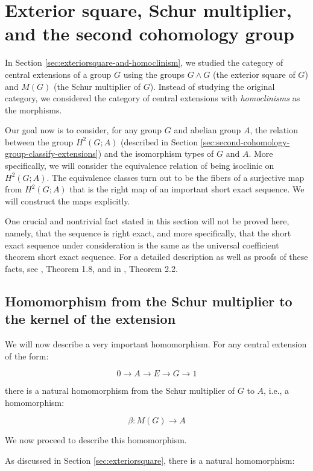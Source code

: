 \documentclass{ucetd}
\begin{document}
\section{Exterior square, Schur multiplier, and the second cohomology group}\label{sec:schur-multipler-and-second-cohomology}

In Section \ref{sec:exteriorsquare-and-homoclinism}, we studied the
category of central extensions of a group $G$ using the groups $G
\wedge G$ (the exterior square of $G$) and $M(G)$ (the Schur
multiplier of $G$). Instead of studying the original category, we
considered the category of central extensions with {\em homoclinisms}
as the morphisms.

Our goal now is to consider, for any group $G$ and abelian group $A$,
the relation between the group $H^2(G;A)$ (described in Section
\ref{sec:second-cohomology-group-classify-extensions}) and the
isomorphism types of $G$ and $A$. More specifically, we will consider
the equivalence relation of being isoclinic on $H^2(G;A)$. The
equivalence classes turn out to be the fibers of a surjective map from
$H^2(G;A)$ that is the right map of an important short exact
sequence. We will construct the maps explicitly.

One crucial and nontrivial fact stated in this section will not be
proved here, namely, that the sequence is right exact, and more
specifically, that the short exact sequence under consideration is the
same as the universal coefficient theorem short exact sequence. For a
detailed description as well as proofs of these facts, see
\cite{BeylIsoclinisms}, Theorem 1.8, and in
\cite{EckmannHiltonStammbach}, Theorem 2.2.

\subsection{Homomorphism from the Schur multiplier to the kernel of the extension}\label{sec:homschurkernel}

We will now describe a very important homomorphism. For any central extension of the form:

$$0 \to A \to E \to G \to 1$$

there is a natural homomorphism from the Schur multiplier of $G$ to $A$, i.e., a homomorphism:

$$\beta: M(G) \to A$$

We now proceed to describe this homomorphism.

As discussed in Section \ref{sec:exteriorsquare}, there is a natural
homomorphism:
\end{document}
